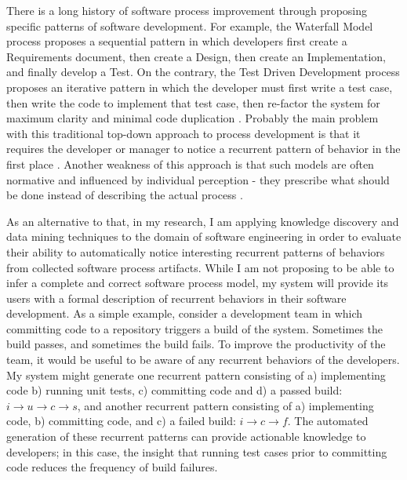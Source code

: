 \documentclass{sig-alternate}
\begin{document}
There is a long history of software process improvement through proposing specific patterns of software development. For example, the Waterfall Model process proposes a sequential pattern in which developers first create a Requirements document, then create a Design, then create an Implementation, and finally develop a Test. On the contrary, the Test Driven Development process proposes an iterative pattern in which the developer must first write a test case, then write the code to implement that test case, then re-factor the system for maximum clarity and minimal code duplication \cite{citeulike:2703162}. Probably the main problem with this traditional top-down approach to process development is that it requires the developer or manager to notice a recurrent pattern of behavior in the first place \cite{citeulike:5043104}. Another weakness of this approach is that such models are often normative and influenced by individual perception - they prescribe what should be done instead of describing the actual process \cite{citeulike:2678511}.

As an alternative to that, in my research, I am applying knowledge discovery and data mining techniques to the domain of software engineering in order to evaluate their ability to automatically notice interesting recurrent patterns of behaviors from collected software process artifacts. While I am not proposing to be able to infer a complete and correct software process model, my system will provide its users with a formal description of recurrent behaviors in their software development. As a simple example, consider a development team in which committing code to a repository triggers a build of the system. Sometimes the build passes, and sometimes the build fails. To improve the productivity of the team, it would be useful to be aware of any recurrent behaviors of the developers. My system might generate one recurrent pattern consisting of a) implementing code b) running unit tests, c) committing code and d) a passed build: $i \rightarrow u \rightarrow c \rightarrow s $, and another recurrent pattern consisting of a) implementing code, b) committing code, and c) a failed build: $i \rightarrow c \rightarrow f $. The automated generation of these recurrent patterns can provide actionable knowledge to developers; in this case, the insight that running test cases prior to committing code reduces the frequency of build failures.
\end{document}
